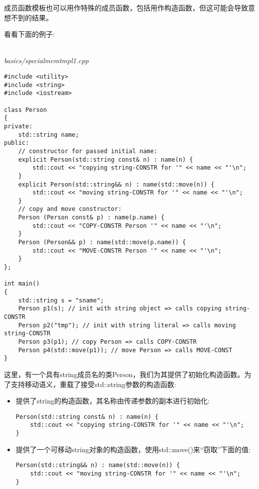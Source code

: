 成员函数模板也可以用作特殊的成员函数，包括用作构造函数，但这可能会导致意想不到的结果。

看看下面的例子:

\hspace*{\fill} \\ %
\noindent
\textit{basics/specialmemtmpl1.cpp}
\begin{lstlisting}[style=styleCXX]
#include <utility>
#include <string>
#include <iostream>

class Person
{
private:
	std::string name;
public:
	// constructor for passed initial name:
	explicit Person(std::string const& n) : name(n) {
		std::cout << "copying string-CONSTR for '" << name << "'\n";
	}
	explicit Person(std::string&& n) : name(std::move(n)) {
		std::cout << "moving string-CONSTR for '" << name << "'\n";
	}
	// copy and move constructor:
	Person (Person const& p) : name(p.name) {
		std::cout << "COPY-CONSTR Person '" << name << "'\n";
	}
	Person (Person&& p) : name(std::move(p.name)) {
		std::cout << "MOVE-CONSTR Person '" << name << "'\n";
	}
};

int main()
{
	std::string s = "sname";
	Person p1(s); // init with string object => calls copying string-CONSTR
	Person p2("tmp"); // init with string literal => calls moving string-CONSTR
	Person p3(p1); // copy Person => calls COPY-CONSTR
	Person p4(std::move(p1)); // move Person => calls MOVE-CONST
}
\end{lstlisting}

这里，有一个具有string成员名的类Person，我们为其提供了初始化构造函数。为了支持移动语义，重载了接受std::string参数的构造函数:

\begin{itemize}
\item 
提供了string的构造函数，其名称由传递参数的副本进行初始化:

\begin{lstlisting}[style=styleCXX]
Person(std::string const& n) : name(n) {
	std::cout << "copying string-CONSTR for '" << name << "'\n";
}
\end{lstlisting}

\item 
提供了一个可移动string对象的构造函数，使用std::move()来“窃取”下面的值:

\begin{lstlisting}[style=styleCXX]
Person(std::string&& n) : name(std::move(n)) {
	std::cout << "moving string-CONSTR for '" << name << "'\n";
}
\end{lstlisting}
\end{itemize}

